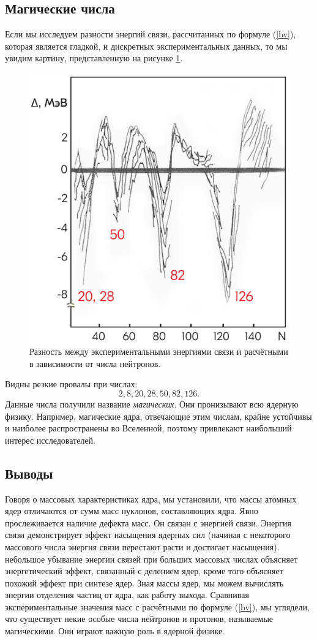 \documentclass[12pt]{article}
\begin{document}
\subsection{Магические числа}
Если мы исследуем разности энергий связи, рассчитанных по формуле (\ref{bv}), которая является гладкой, и дискретных экспериментальных данных, то мы увидим картину, представленную на рисунке \ref{fig:6}.
\begin{figure}[ht]
	\centering
	\includegraphics[scale = 0.5]{fig6.png}
	\caption{Разность между экспериментальными энергиями связи и расчётными в зависимости от числа нейтронов.}
	\label{fig:6}
\end{figure}
Видны резкие провалы при числах:
$$
2,8,20,28,50,82,126.
$$
Данные числа получили название \emph{магических}. Они пронизывают всю ядерную физику. Например, магические ядра, отвечающие этим числам, крайне устойчивы и наиболее распространены во Вселенной, поэтому привлекают наибольший интерес исследователей.
\subsection{Выводы}
Говоря о массовых характеристиках ядра, мы установили, что массы атомных ядер отличаются от сумм масс нуклонов, составляющих ядра. Явно прослеживается наличие дефекта масс. Он связан с энергией связи. Энергия связи демонстрирует эффект насыщения ядерных сил (начиная с некоторого массового числа энергия связи перестают расти и достигает насыщения). небольшое убывание энергии связей при больших массовых числах объясняет энергетический эффект, связанный с делением ядер, кроме того объясняет похожий эффект при синтезе ядер. Зная массы ядер, мы можем вычислять энергии отделения частиц от ядра, как работу выхода. Сравнивая экспериментальные значения масс с расчётными по формуле (\ref{bv}), мы углядели, что существует некие особые числа нейтронов и протонов, называемые магическими. Они играют важную роль в ядерной физике.
\end{document}
